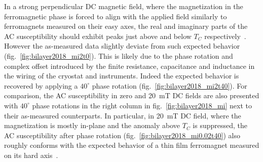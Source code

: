 In a strong perpendicular DC magnetic field, where the magnetization in the ferromagnetic phase is forced to align with the applied field similarly to ferromagnets measured on their easy axes, the real and imaginary parts of the AC susceptibility should exhibit peaks just above and below $T_C$ respectively~\cite{ac_nitroxide, Venus2004}. However the as-measured data slightly deviate from such expected behavior (fig.~\ref{fig:bilayer2018_mi2t0}). This is likely due to the phase rotation and complex offset introduced by the finite resistance, capacitance and inductance in the wiring of the cryostat and instruments. Indeed the expected behavior is recovered by applying a $40^{\circ}$ phase rotation (fig.~\ref{fig:bilayer2018_mi2t40}). For comparison, the AC susceptibility in zero and 20~mT DC fields are also presented with $40^{\circ}$ phase rotations in the right column in fig.~\ref{fig:bilayer2018_mi} next to their as-measured counterparts. In particular, in 20~mT DC field, where the magnetization is mostly in-plane and the anomaly above $T_C$ is suppressed, the AC susceptibility after phase rotation (fig.~\ref{fig:bilayer2018_mi0.02t40}) also roughly conforms with the expected behavior of a thin film ferromagnet measured on its hard axis~\cite{Jensen2003}.


